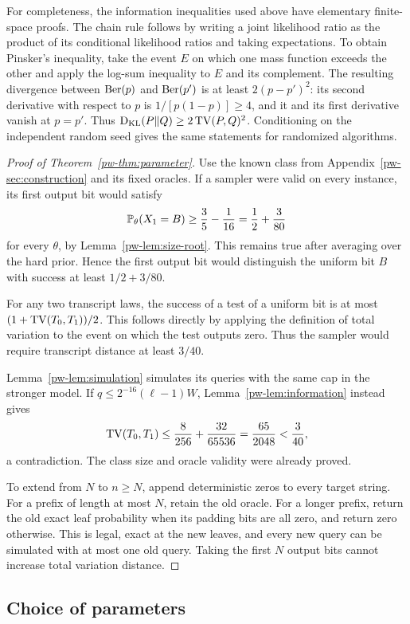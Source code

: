 For completeness, the information inequalities used above have elementary finite-space proofs. The chain rule follows by writing a joint likelihood ratio as the product of its conditional likelihood ratios and taking expectations. To obtain Pinsker's inequality, take the event $E$ on which one mass function exceeds the other and apply the log-sum inequality to $E$ and its complement. The resulting divergence between $\operatorname{Ber}(p)$ and $\operatorname{Ber}(p')$ is at least $2(p-p')^2$: its second derivative with respect to $p$ is $1/[p(1-p)]\ge4$, and it and its first derivative vanish at $p=p'$. Thus $\operatorname{D_{\mathrm{KL}}}(P\Vert Q)\ge2\operatorname{TV}(P,Q)^2$. Conditioning on the independent random seed gives the same statements for randomized algorithms.

\begin{proof}[Proof of Theorem~\ref{pw-thm:parameter}]
Use the known class from Appendix~\ref{pw-sec:construction} and its fixed oracles. If a sampler were valid on every instance, its first output bit would satisfy
\[
\mathbb P_\theta(X_1=B)\ge\frac35-\frac1{16}
=\frac12+\frac3{80}
\]
for every $\theta$, by Lemma~\ref{pw-lem:size-root}. This remains true after averaging over the hard prior. Hence the first output bit would distinguish the uniform bit $B$ with success at least $1/2+3/80$.

For any two transcript laws, the success of a test of a uniform bit is at most $(1+\operatorname{TV}(T_0,T_1))/2$. This follows directly by applying the definition of total variation to the event on which the test outputs zero. Thus the sampler would require transcript distance at least $3/40$.

Lemma~\ref{pw-lem:simulation} simulates its queries with the same cap in the stronger model. If $q\le2^{-16}(\ell-1)W$, Lemma~\ref{pw-lem:information} instead gives
\[
\operatorname{TV}(T_0,T_1)\le\frac8{256}+\frac{32}{65536}
=\frac{65}{2048}<\frac3{40},
\]
a contradiction. The class size and oracle validity were already proved.

To extend from $N$ to $n\ge N$, append deterministic zeros to every target string. For a prefix of length at most $N$, retain the old oracle. For a longer prefix, return the old exact leaf probability when its padding bits are all zero, and return zero otherwise. This is legal, exact at the new leaves, and every new query can be simulated with at most one old query. Taking the first $N$ output bits cannot increase total variation distance.
\end{proof}

\subsection{Choice of parameters}\label{pw-sec:parameters}

